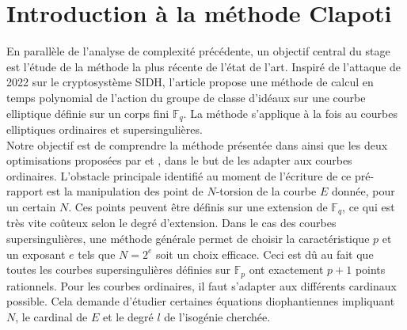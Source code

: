 \documentclass{article}
\newcommand{\F}[0]{\mathbb{F}}
\theoremstyle{definition}
\theoremstyle{remark}
\begin{document}
	\section{Introduction à la méthode Clapoti}
	
	En parallèle de l'analyse de complexité précédente, un objectif central du stage est l'étude de la méthode la plus récente de l'état de l'art. Inspiré de l'attaque de 2022 sur le cryptosystème SIDH, l'article \cite{Clapoti} propose une méthode de calcul en temps polynomial de l'action du groupe de classe d'idéaux sur une courbe elliptique définie sur un corps fini $\F_q$. La méthode s'applique à la fois au courbes elliptiques ordinaires et supersingulières.\\
	
	Notre objectif est de comprendre la méthode présentée dans \cite{Clapoti} ainsi que les deux optimisations proposées par \cite{KLaPoTi} et \cite{Pegasis}, dans le but de les adapter aux courbes ordinaires. L'obstacle principale identifié au moment de l'écriture de ce pré-rapport est la manipulation des point de $N$-torsion de la courbe $E$ donnée, pour un certain $N$. Ces points peuvent être définis sur une extension de $\F_q$, ce qui est très vite coûteux selon le degré d'extension. Dans le cas des courbes supersingulières, une méthode générale permet de choisir la caractéristique $p$ et un exposant $e$ tels que $N = 2^e$ soit un choix efficace. Ceci est dû au fait que toutes les courbes supersingulières définies sur $\F_p$ ont exactement $p+1$ points rationnels. Pour les courbes ordinaires, il faut s'adapter aux différents cardinaux possible. Cela demande d'étudier certaines équations diophantiennes impliquant $N$, le cardinal de $E$ et le degré $l$ de l'isogénie cherchée.\\
	
	
	
	\newpage
	\printbibliography
	
\end{document}
